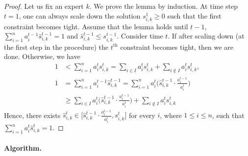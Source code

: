 \begin{proof}
Let us fix an expert $k$. We prove the lemma by induction. At time step $t=1$, one can always scale down the solution $s_{i,k}^{1} \geq 0$ such that the first constraint becomes tight.
Assume that the lemma holds until $t-1$, $\sum_{i=1}^{n} a_{i}^{t-1} \hat{s}_{i,k}^{t-1} = 1$ and $\hat{s}_{i,k}^{t-1} \leq s_{i,k}^{t-1}$.
Consider time $t$. If after scaling down (at the first step in the procedure) the $t^{\text{th}}$ constraint becomes tight, then we are done. Otherwise, we have
	\begin{align*}
		1 &< \sum_{i=1}^{n} a_{i}^{t} s_{i,k}^{t} = \sum_{i \in I} a_{i}^{t} s_{i,k}^{t} + \sum_{i \notin I} a_{i}^{t} s_{i,k}^{t}, \\
		1 &= \sum_{i=1}^{n} a_{i}^{t-1} \hat{s}_{i,k}^{t-1} =  \sum_{i = 1}^{n} a_{i}^{t} \biggl( \hat{s}_{i,k}^{t-1} \cdot \frac{a_{i}^{t-1}}{a_{i}^{t}} \biggr) \\
		&\geq  \sum_{i \in I} a_{i}^{t} \biggl( \hat{s}_{i,k}^{t-1} \cdot \frac{a_{i}^{t-1}}{a_{i}^{t}} \biggr)
		+ \sum_{i \notin I} a_{i}^{t} s_{i,k}^{t}
	\end{align*}
	Hence, there exists $\hat{s}_{i,k}^{t} \in \bigl[ \hat{s}_{i,k}^{t-1} \cdot \frac{a_{i}^{t-1}}{a_{i}^{t}}, s_{i,k}^{t} \bigr]$ for every $i$, where $1 \leq i \leq n$, such that $\sum_{i=1}^{n} a_{i}^{t} \hat{s}_{i,k}^{t} = 1$.
\end{proof}

\clearpage

\paragraph{Algorithm.}


